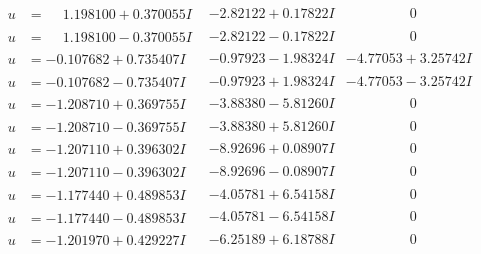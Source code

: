 \documentclass[1p]{elsarticle_modified}
\theoremstyle{definition}
\begin{document}
$$\begin{array}{c|c|c}
 \hline 
\begin{aligned}
u &= \phantom{-}1.198100 + 0.370055 I\end{aligned}
 & -2.82122 + 0.17822 I & \phantom{-0.000000 } 0 \\ \hline\begin{aligned}
u &= \phantom{-}1.198100 - 0.370055 I\end{aligned}
 & -2.82122 - 0.17822 I & \phantom{-0.000000 } 0 \\ \hline\begin{aligned}
u &= -0.107682 + 0.735407 I\end{aligned}
 & -0.97923 - 1.98324 I & -4.77053 + 3.25742 I \\ \hline\begin{aligned}
u &= -0.107682 - 0.735407 I\end{aligned}
 & -0.97923 + 1.98324 I & -4.77053 - 3.25742 I \\ \hline\begin{aligned}
u &= -1.208710 + 0.369755 I\end{aligned}
 & -3.88380 - 5.81260 I & \phantom{-0.000000 } 0 \\ \hline\begin{aligned}
u &= -1.208710 - 0.369755 I\end{aligned}
 & -3.88380 + 5.81260 I & \phantom{-0.000000 } 0 \\ \hline\begin{aligned}
u &= -1.207110 + 0.396302 I\end{aligned}
 & -8.92696 + 0.08907 I & \phantom{-0.000000 } 0 \\ \hline\begin{aligned}
u &= -1.207110 - 0.396302 I\end{aligned}
 & -8.92696 - 0.08907 I & \phantom{-0.000000 } 0 \\ \hline\begin{aligned}
u &= -1.177440 + 0.489853 I\end{aligned}
 & -4.05781 + 6.54158 I & \phantom{-0.000000 } 0 \\ \hline\begin{aligned}
u &= -1.177440 - 0.489853 I\end{aligned}
 & -4.05781 - 6.54158 I & \phantom{-0.000000 } 0 \\ \hline\begin{aligned}
u &= -1.201970 + 0.429227 I\end{aligned}
 & -6.25189 + 6.18788 I & \phantom{-0.000000 } 0 \\ \hline\begin{aligned}

\end{aligned}
\end{array}$$
\end{document}
